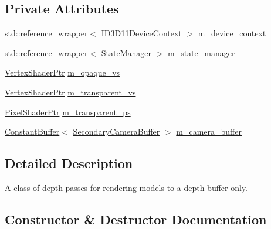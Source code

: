 \subsection*{Private Attributes}
\begin{DoxyCompactItemize}
\item 
std\+::reference\+\_\+wrapper$<$ I\+D3\+D11\+Device\+Context $>$ \mbox{\hyperlink{classmage_1_1rendering_1_1_depth_pass_a304b434841fb8a8b443df0e790630023}{m\+\_\+device\+\_\+context}}
\item 
std\+::reference\+\_\+wrapper$<$ \mbox{\hyperlink{classmage_1_1rendering_1_1_state_manager}{State\+Manager}} $>$ \mbox{\hyperlink{classmage_1_1rendering_1_1_depth_pass_a86c299c8b6ec689c83c60451fd988a35}{m\+\_\+state\+\_\+manager}}
\item 
\mbox{\hyperlink{namespacemage_1_1rendering_aaf704b9c54a4181f4950a1761de69dda}{Vertex\+Shader\+Ptr}} \mbox{\hyperlink{classmage_1_1rendering_1_1_depth_pass_a101f60b0363f79f9d349ea95e0efabe5}{m\+\_\+opaque\+\_\+vs}}
\item 
\mbox{\hyperlink{namespacemage_1_1rendering_aaf704b9c54a4181f4950a1761de69dda}{Vertex\+Shader\+Ptr}} \mbox{\hyperlink{classmage_1_1rendering_1_1_depth_pass_ab505e6b33ab449c2b7914d93e728eabb}{m\+\_\+transparent\+\_\+vs}}
\item 
\mbox{\hyperlink{namespacemage_1_1rendering_af03d922b228ee9c8542baaa2ecc9f259}{Pixel\+Shader\+Ptr}} \mbox{\hyperlink{classmage_1_1rendering_1_1_depth_pass_a6ef4d5064ab4cb485ae77cb230f90c6a}{m\+\_\+transparent\+\_\+ps}}
\item 
\mbox{\hyperlink{classmage_1_1rendering_1_1_constant_buffer}{Constant\+Buffer}}$<$ \mbox{\hyperlink{structmage_1_1rendering_1_1_secondary_camera_buffer}{Secondary\+Camera\+Buffer}} $>$ \mbox{\hyperlink{classmage_1_1rendering_1_1_depth_pass_aa4faded6ae9f01ea963379f6955d53ab}{m\+\_\+camera\+\_\+buffer}}
\end{DoxyCompactItemize}


\subsection{Detailed Description}
A class of depth passes for rendering models to a depth buffer only. 

\subsection{Constructor \& Destructor Documentation}
\mbox{\label{classmage_1_1rendering_1_1_depth_pass_a0be584f68a1a6b4d3b63616c449e903d}} 
